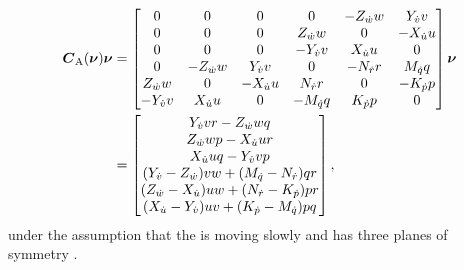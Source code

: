 \begin{align}
\begin{split}
    \boldsymbol{C}_\text{A}(\boldsymbol{\nu}) \boldsymbol{\nu} &= 
    \begin{bmatrix}
    0 & 0 & 0 & 0 & -Z_{\dot{w}} w & Y_{\dot{v}} v \\
    0 & 0 & 0 & Z_{\dot{w}} w & 0 & -X_{\dot{u}} u \\
    0 & 0 & 0 & -Y_{\dot{v}} v & X_{\dot{u}} u & 0 \\
    0 & -Z_{\dot{w}} w & Y_{\dot{v}} v & 0 & -N_{\dot{r}} r & M_{\dot{q}} q \\
    Z_{\dot{w}} w & 0 & -X_{\dot{u}} u & N_{\dot{r}} r & 0 & -K_{\dot{p}} p \\
    -Y_{\dot{v}} v & X_{\dot{u}} u & 0 & - M_{\dot{q}} q & K_{\dot{p}} p & 0 \\
    \end{bmatrix}
    \boldsymbol{\nu} \\ 
    &= \begin{bmatrix}
        Y_{\dot{v}} v r - Z_{\dot{w}} w q\\
        Z_{\dot{w}} w p - X_{\dot{u}} u r\\
        X_{\dot{u}} u q - Y_{\dot{v}} v p \\
        (Y_{\dot{v}} - Z_{\dot{w}}) v w + (M_{\dot{q}} - N_{\dot{r}}) q r\\
        (Z_{\dot{w}} - X_{\dot{u}}) u w + (N_{\dot{r}} - K_{\dot{p}}) p r\\
        (X_{\dot{u}} - Y_{\dot{v}}) u v + (K_{\dot{p}} - M_{\dot{q}}) p q \\
    \end{bmatrix},
    \end{split}
\end{align}
under the assumption that the \abbrROV is moving slowly and has three planes of symmetry \citep[p. 121]{fossen2011}.  

